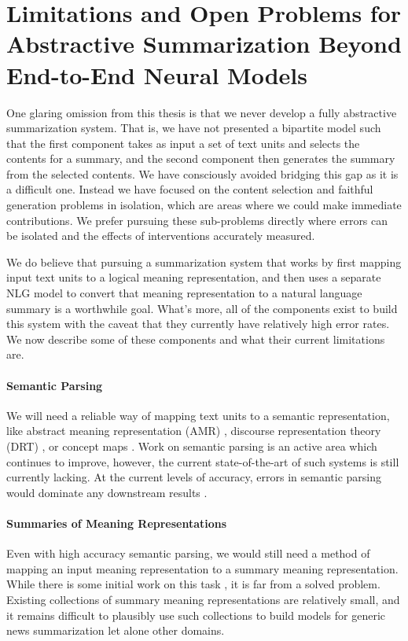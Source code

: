 \section{Limitations and Open Problems for Abstractive Summarization Beyond End-to-End Neural Models}

One glaring omission from this thesis is that we never develop a fully
abstractive summarization system.  That is, we have not presented a bipartite
model such that the first component takes as input a set of text units and
selects the contents for a summary, and the second component then generates
the summary from the selected contents. We have consciously avoided bridging
this gap as it is a difficult one.  Instead we have focused on the content
selection and faithful generation problems in isolation, which are areas where
we could make immediate contributions. We prefer pursuing these sub-problems
directly where errors can be isolated and the effects of interventions
accurately measured.  

We do believe that pursuing a summarization system that works by first mapping
input text units to a logical meaning representation, and then uses a separate
NLG model to convert that meaning representation to a natural language summary
is a worthwhile goal. What's more, all of the components exist to build this
system with the caveat that they currently have relatively high error rates.
We now describe some of these components and what their current limitations
are.

\paragraph{Semantic Parsing} We will need a reliable way of mapping text units
to a semantic representation, like abstract meaning representation (AMR)
\citep{banarescu2013}, discourse representation theory (DRT)
\citep{basile2012}, or concept maps \citep{yang2020}.  Work on semantic
parsing is an active area which continues to improve, however, the current
state-of-the-art of such systems is still currently lacking. At the current
levels of accuracy, errors in semantic parsing would dominate any downstream
results \citep{zhang2019b}. 

\paragraph{Summaries of Meaning Representations} Even with high accuracy
semantic parsing, we would still need a method of mapping an input meaning
representation to a summary meaning representation. While there is some
initial work on this task \citep{falke2017,liao2018,falke2019},  it is far
from a solved problem.  Existing collections of summary meaning
representations are relatively small, and it remains difficult to plausibly
use such collections to build models for generic news summarization let alone
other domains.

